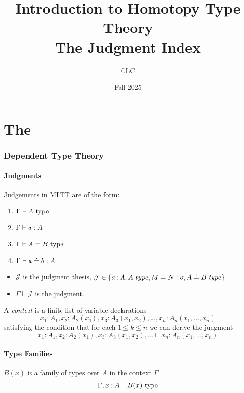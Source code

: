 \documentclass{article}
\title{Introduction to  Homotopy Type Theory\\ \large The Judgment Index}
\author{CLC}
\date{Fall 2025}
\begin{document}
\maketitle
\part{The \MLTT}
\section{Dependent Type Theory}

\subsection{Judgments}

\begin{definition}[Judgments.]
  Judgements in MLTT are of the form:
  \begin{enumerate}
  \item $\Gamma \vdash{A}~\mathrm{type}$
  \item $\Gamma \vdash{a}: A$
  \item $\Gamma \vdash{A}\doteq{B}~\mathrm{type}$
  \item $\Gamma \vdash{a}\doteq{b}:A$
  \end{enumerate}
\end{definition}
\begin{itemize}
\item $\mathcal{J}$ is the judgment thesis,
  ${\mathcal{J} \in \{a\mathbin{:} A, A ~ type, M \doteq N : \sigma, A \doteq B ~ type\}}$
\item $\Gamma \vdash \mathcal{J}$ is the judgment.
\end{itemize}

\begin{definition}[Context.]
  A \emph{context} is a finite list of variable declarations
  \[ x_1 : A_1, x_2 : A_2(x_1), x_3 : A_3(x_1, x_2), ..., x_n : A_n (x_1, ..., x_n) \]
  satisfying the condition that for each $1 \leq k \leq n$
  we can derive the judgment
  \[ x_1 : A_1, x_2 : A_2(x_1), x_3 : A_3(x_1, x_2), ... \vdash x_n : A_n (x_1, ..., x_n) \]
\end{definition}

\subsection{Type Families}

\begin{definition}
  $B(x)$ is a family of types over $A$ in the context $\Gamma$
  \[ \Gamma, x \mathbin{:} A \vdash{B(x)}~\mathrm{type} \]
\end{definition}
\end{document}
